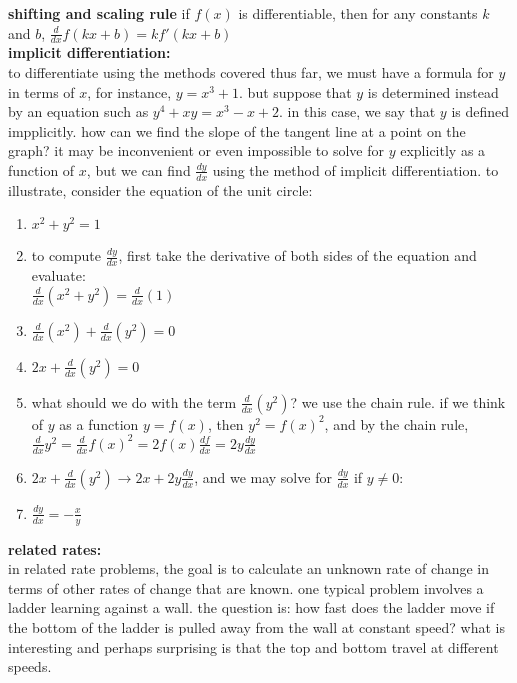 \documentclass{article}
\begin{document}
\textbf{shifting and scaling rule} if $f(x)$ is differentiable, then for any constants $k$ and $b$, $\frac{d}{dx}f(kx + b) = kf'(kx + b)$\\

\textbf{implicit differentiation:}\\
to differentiate using the methods covered thus far, we must have a formula for $y$ in terms of $x$, for instance, $y = x^3 + 1$. but suppose that $y$ is determined instead by an equation such as $y^4 + xy = x^3 - x + 2$. in this case, we say that $y$ is defined impplicitly. how can we find the slope of the tangent line at a point on the graph? it may be inconvenient or even impossible to solve for $y$ explicitly as a function of $x$, but we can find $\frac{dy}{dx}$ using the method of implicit differentiation. to illustrate, consider the equation of the unit circle:
	\begin{enumerate}
		\item $x^2 + y^2 = 1$
		\item to compute $\frac{dy}{dx}$, first take the derivative of both sides of the equation and evaluate: \\ $\frac{d}{dx}(x^2 + y^2) = \frac{d}{dx}(1)$
		\item $\frac{d}{dx}(x^2) + \frac{d}{dx}(y^2) = 0$
		\item $2x + \frac{d}{dx}(y^2) = 0$
		\item what should we do with the term $\frac{d}{dx}(y^2)$? we use the chain rule. if we think of $y$ as a function $y = f(x)$, then $y^2 = f(x)^2$, and by the chain rule,\\ $\frac{d}{dx}y^2 = \frac{d}{dx}f(x)^2 = 2f(x)\frac{df}{dx} = 2y\frac{dy}{dx}$
		\item $2x + \frac{d}{dx}(y^2)\to 2x + 2y\frac{dy}{dx}$, and we may solve for $\frac{dy}{dx}$ if $y \neq 0$:
		\item $\frac{dy}{dx} = -\frac{x}{y}$
	\end{enumerate}

\textbf{related rates:}\\
in related rate problems, the goal is to calculate an unknown rate of change in terms of other rates of change that are known. one typical problem involves a ladder learning against a wall. the question is: how fast does the ladder move if the bottom of the ladder is pulled away from the wall at constant speed? what is interesting and perhaps surprising is that the top and bottom travel at different speeds.\\
\end{document}
